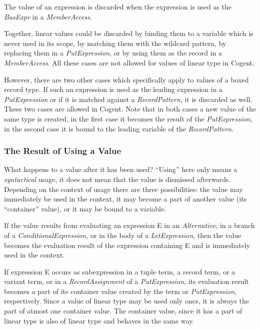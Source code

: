\documentclass[a4paper]{report}
\newcommand{\cogent}{Cogent\xspace}
\begin{document}
The value of an expression is discarded when the expression is used as the \textit{BasExpr} in a \textit{MemberAccess}.

Together, linear values could be discarded by binding them to a variable which is never used in its scope, by matching them 
with the wildcard pattern, by replacing them in a \textit{PutExpression}, or by using them as the record in a \textit{MemberAccess}.
All these cases are not allowed for values of linear type in \cogent.

However, there are two other cases which specifically apply to values of a boxed record type. If such an expression is used 
as the leading expression in a \textit{PutExpression} or if it is matched against a \textit{RecordPattern}, it is discarded
as well. These two cases are allowed in \cogent. Note that in both cases a new value of the same type is created, in the
first case it becomes the result of the \textit{PutExpression}, in the second case it is bound to the leading variable of the
\textit{RecordPattern}.

\subsubsection{The Result of Using a Value}

What happens to a value after it has been used? ``Using'' here only means a \textit{syntactical} usage, it does not mean
that the value is dismissed afterwards. Depending on the context of usage there are three possibilities: the value may immediately
be used in the context, it may become a part of another value (its ``container'' value), or it may be bound to a variable.

If the value results from evaluating an expression E in an \textit{Alternative}, in a branch of a \textit{ConditionalExpression}, or 
in the body of a \textit{LetExpression}, then the value becomes the evaluation result of the expression containing E and is immediately
used in the context.

If expression E occurs as subexpression in a tuple term, a record term, or a variant term, or in a \textit{RecordAssignment} of
a \textit{PutExpression}, its evaluation result becomes a part of its container value created by the term or \textit{PutExpression}, 
respectively. Since a value of linear type may be used only once, it is always the part of atmost one container value. The container
value, since it has a part of linear type is also of linear type and behaves in the same way. 
\end{document}
